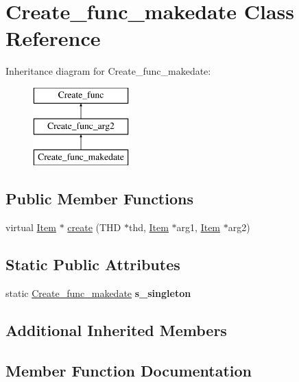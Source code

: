 \hypertarget{classCreate__func__makedate}{}\section{Create\+\_\+func\+\_\+makedate Class Reference}
\label{classCreate__func__makedate}
Inheritance diagram for Create\+\_\+func\+\_\+makedate\+:\begin{figure}[H]
\begin{center}
\leavevmode
\includegraphics[height=3.000000cm]{classCreate__func__makedate}
\end{center}
\end{figure}
\subsection*{Public Member Functions}
\begin{DoxyCompactItemize}
\item 
virtual \mbox{\hyperlink{classItem}{Item}} $\ast$ \mbox{\hyperlink{classCreate__func__makedate_aa5f12403025678e084f275058ea322a8}{create}} (T\+HD $\ast$thd, \mbox{\hyperlink{classItem}{Item}} $\ast$arg1, \mbox{\hyperlink{classItem}{Item}} $\ast$arg2)
\end{DoxyCompactItemize}
\subsection*{Static Public Attributes}
\begin{DoxyCompactItemize}
\item 
\mbox{\label{classCreate__func__makedate_a2eaa230c20cca46d45f49642c999782e}} 
static \mbox{\hyperlink{classCreate__func__makedate}{Create\+\_\+func\+\_\+makedate}} {\bfseries s\+\_\+singleton}
\end{DoxyCompactItemize}
\subsection*{Additional Inherited Members}


\subsection{Member Function Documentation}
\mbox{\label{classCreate__func__makedate_aa5f12403025678e084f275058ea322a8}} 
